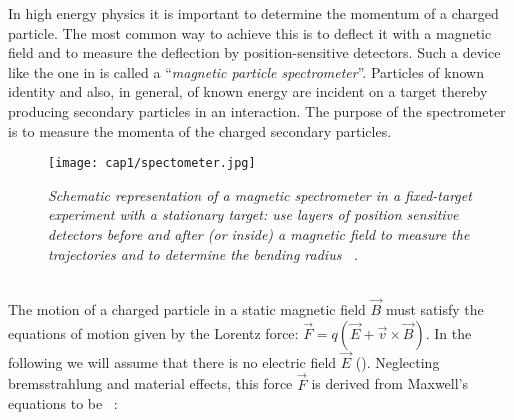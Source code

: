 In high energy physics it is important to determine the momentum of a charged
particle. The most common way to achieve this is to deflect it with a magnetic
field and to measure the deflection by position-sensitive detectors. Such a
device like the one in  is called a ``{\it magnetic particle
  spectrometer}''. Particles of known identity and also, in general, of known
energy are incident on a target thereby producing secondary particles in an
interaction. The purpose of the spectrometer is to measure the momenta of the
charged secondary particles.
\begin{figure}[!htbp]
  \centering\texttt{[image: cap1/spectometer.jpg]}
  \caption{\textit{Schematic representation of a magnetic spectrometer in a
      fixed-target experiment with a stationary target: use layers of position
      sensitive detectors before and after (or inside) a magnetic field to
      measure the trajectories and to determine the bending radius
      ~\cite{Grupen}.}}\label{spectrometer}
\end{figure}\\
The motion of a charged particle in a static magnetic field $\vec{B}$ must
satisfy the equations of motion given by the Lorentz force:
$\vec{F}=q(\vec{E}+\vec{v}\times\vec{B})$. In the following we will assume that
there is no electric field $\vec{E}$ (). Neglecting bremsstrahlung
and material effects, this force $\vec{F}$ is derived from Maxwell's equations
to be ~\cite{Fruhwith}:

